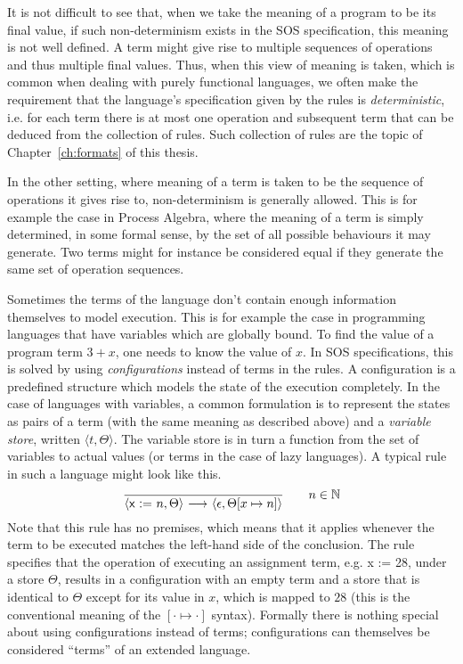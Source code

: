 It is not difficult to see that, when we take the meaning of a program to be its
final value, if such non-determinism exists in the SOS specification, this meaning
is not well defined. A term might give rise to multiple sequences of operations and
thus multiple final values. Thus, when this view of meaning is taken, which is
common when dealing with purely functional languages, we often make the requirement that
the language's specification given by the rules is \emph{deterministic}, 
i.e. for each term
there is at most one operation and subsequent term that can be deduced from the
collection of rules. Such collection of rules are the topic of Chapter~\ref{ch:formats}
of this thesis.

In the other setting, where meaning of a term is taken to be the sequence of
operations it gives rise to, non-determinism is generally allowed. This is for example
the case in Process Algebra, where the meaning of a term is simply
determined, in some formal sense, by
the set of all possible behaviours it may generate. Two terms might for instance be considered
equal if they generate the same set of operation sequences.

\vspace{1em}

Sometimes the terms of the language don't contain enough information themselves
to model execution. This is for example the case in programming languages that have
variables which are globally bound. To find the value of a program term $3 + x$,
one needs to know the value of $x$. In SOS specifications, this is solved by using
\emph{configurations} instead of terms in the rules. A configuration is a predefined
structure which models the state of the execution completely. In the case of languages
with variables, a common formulation is to represent the states as pairs of a
term (with the same meaning as described above) and a \emph{variable store}, written
$\langle t, \Theta \rangle$. The variable store is in turn a function from the
set of variables to actual values (or terms in the case of lazy languages).
A typical rule in such a language might look like this.
\begin{equation}\label{eq:intro_rule3}
    \frac{}{\langle \textsf{x := }n, \Theta\rangle \ {\stackrel{{}}{\longrightarrow}}\ 
            \langle \epsilon, \Theta[x\mapsto n]\rangle} \qquad n\in \mathbb{N}
\end{equation}
Note that this rule has no premises, which means that it applies whenever the term
to be executed matches the left-hand side of the conclusion.
The rule specifies that the operation of executing an assignment term, e.g.
\textsf{x := 28}, under a store $\Theta$, results in a configuration with an
empty term and a store that is identical to $\Theta$ except for its value in $x$,
which is mapped to $28$ (this is the conventional meaning of the $[\cdot\mapsto\cdot]$ syntax).
Formally there is nothing special about using configurations instead of terms;
configurations can themselves be considered ``terms'' of an extended language.

